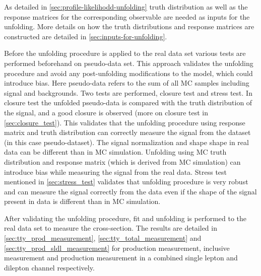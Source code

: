 As detailed in \cref{sec:profile-likelihodd-unfolding} truth distribution as well as the response matrices for the corresponding observable are needed as inputs for the unfolding. More details on how the truth distributions and response matrices are constructed are detailed in \cref{sec:inputs-for-unfolding}.

Before the unfolding procedure is applied to the real data set various tests are performed beforehand on pseudo-data set. This approach validates the unfolding procedure and avoid any post-unfolding modifications to the model, which could introduce bias. Here pseudo-data refers to the sum of all MC samples including signal and backgrounds. Two tests are performed, closure test and stress test. In closure test the unfolded pseudo-data is compared with the truth distribution of the signal, and a good closure is observed (more on closure test in \cref{sec:closure_test}). This validates that the unfolding procedure using response matrix and truth distribution can correctly measure the signal from the dataset (in this case pseudo-dataset). The signal normalization and shape shape in real data can be different than in MC simulation. Unfolding using MC truth distribution and response matrix (which is derived from MC simulation) can introduce bias while measuring the signal from the real data. Stress test mentioned in \cref{sec:stress_test} validates that unfolding procedure is very robust and can measure the signal correctly from the data even if the shape of the signal present in data is different than in MC simulation. 

After validating the unfolding procedure, fit and unfolding is performed to the real data set to measure the cross-section. The results are detailed in \cref{sec:tty_prod_measurement}, \cref{sec:tty_total_measurement} and \cref{sec:tty_prod_sldl_measurement} for \tty production measurement, inclusive \tty measurement and \tty production measurement in a combined single lepton and dilepton channel respectively.




%

